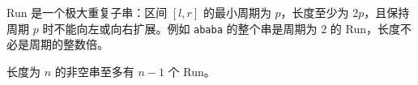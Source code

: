 Run 是一个极大重复子串：区间 $[l,r]$ 的最小周期为 $p$，长度至少为 $2p$，且保持周期 $p$ 时不能向左或向右扩展。例如 \texttt{ababa} 的整个串是周期为 $2$ 的 Run，长度不必是周期的整数倍。

长度为 $n$ 的非空串至多有 $n-1$ 个 Run。
